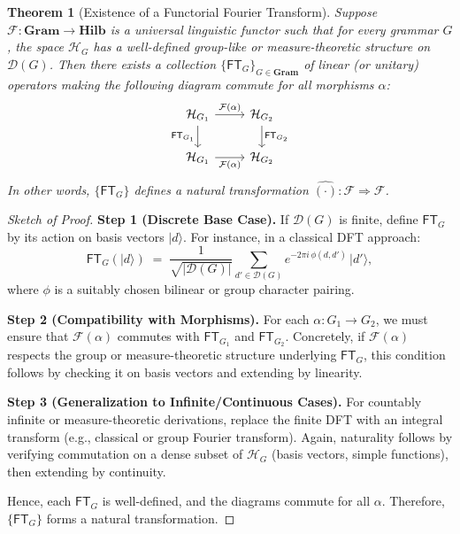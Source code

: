 \documentclass[11pt]{article}
\newtheorem{theorem}{Theorem}[section]
\begin{document}
\begin{theorem}[Existence of a Functorial Fourier Transform]
\label{thm:existence-fft}
Suppose \(\mathcal{F}: \mathbf{Gram} \to \mathbf{Hilb}\) is a universal linguistic functor such that for every grammar \(G\), the space \(\mathcal{H}_G\) has a well-defined group-like or measure-theoretic structure on \(\mathcal{D}(G)\). Then there exists a collection \(\{\mathsf{FT}_G\}_{G \in \mathbf{Gram}}\) of linear (or unitary) operators making the following diagram commute for all morphisms \(\alpha\):
\[
\begin{tikzcd}
\mathcal{H}_{G_1} \arrow[r, "\mathcal{F}(\alpha)"] \arrow[d, "\mathsf{FT}_{G_1}"']
& \mathcal{H}_{G_2} \arrow[d, "\mathsf{FT}_{G_2}"] \\
\mathcal{H}_{G_1} \arrow[r, "\mathcal{F}(\alpha)"']
& \mathcal{H}_{G_2}
\end{tikzcd}
\]
In other words, \(\{\mathsf{FT}_G\}\) defines a natural transformation \(\widehat{(\cdot)} : \mathcal{F} \Rightarrow \mathcal{F}\).
\end{theorem}

\begin{proof}[Sketch of Proof]
\noindent
\textbf{Step 1 (Discrete Base Case).}  
If \(\mathcal{D}(G)\) is finite, define \(\mathsf{FT}_G\) by its action on basis vectors \(\lvert d\rangle\). For instance, in a classical DFT approach:
\[
 \mathsf{FT}_G(\lvert d\rangle) 
 \;=\;
 \frac{1}{\sqrt{|\mathcal{D}(G)|}}
 \sum_{d' \in \mathcal{D}(G)} e^{-2\pi i \,\phi(d, d')} \,\lvert d'\rangle,
\]
where \(\phi\) is a suitably chosen bilinear or group character pairing.

\noindent
\textbf{Step 2 (Compatibility with Morphisms).}  
For each \(\alpha: G_1 \to G_2\), we must ensure that \(\mathcal{F}(\alpha)\) commutes with \(\mathsf{FT}_{G_1}\) and \(\mathsf{FT}_{G_2}\). Concretely, if \(\mathcal{F}(\alpha)\) respects the group or measure-theoretic structure underlying \(\mathsf{FT}_G\), this condition follows by checking it on basis vectors and extending by linearity.

\noindent
\textbf{Step 3 (Generalization to Infinite/Continuous Cases).}  
For countably infinite or measure-theoretic derivations, replace the finite DFT with an integral transform (e.g., classical or group Fourier transform). Again, naturality follows by verifying commutation on a dense subset of \(\mathcal{H}_G\) (basis vectors, simple functions), then extending by continuity.

\noindent
Hence, each \(\mathsf{FT}_G\) is well-defined, and the diagrams commute for all \(\alpha\). Therefore, \(\{\mathsf{FT}_G\}\) forms a natural transformation.
\end{proof}
\end{document}
